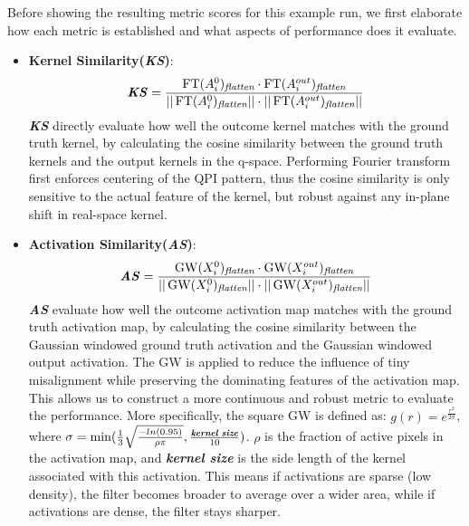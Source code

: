 Before showing the resulting metric scores for this example run, we first elaborate how each metric is established and what aspects of performance does it evaluate. 
\begin{itemize}
	\item \textbf{Kernel Similarity(\textit{KS})}: 
	\begin{equation}
		\textbf{\textit{KS}} = \frac{\operatorname{FT}(A_i^0)_{\textit{flatten}} \cdot  \operatorname{FT}(A_i^{out})_{\textit{flatten}}}{\vert \vert \operatorname{FT}(A_i^0)_{\textit{flatten}} \vert \vert \cdot  \vert \vert \operatorname{FT}(A_i^{out})_{\textit{flatten}}\vert \vert}
	\end{equation}
	\textbf{\textit{KS}} directly evaluate how well the outcome kernel matches with the ground truth kernel, by calculating the cosine similarity between the ground truth kernels and the output kernels in the q-space. Performing Fourier transform first enforces centering of the \ac{QPI} pattern, thus the cosine similarity is only sensitive to the actual feature of the kernel, but robust against any in-plane shift in real-space kernel. 
	
	\item \textbf{Activation Similarity(\textit{AS})}: 
	\begin{equation}
		\textbf{\textit{AS}} = \frac{\operatorname{GW}(X_i^0)_{\textit{flatten}} \cdot  \operatorname{GW}(X_i^{out})_{\textit{flatten}}}{\vert \vert \operatorname{GW}(X_i^0)_{\textit{flatten}} \vert \vert \cdot  \vert \vert \operatorname{GW}(X_i^{out})_{\textit{flatten}}\vert \vert}
	\end{equation}
	\textbf{\textit{AS}} evaluate how well the outcome activation map matches with the ground truth activation map, by calculating the cosine similarity between the Gaussian windowed ground truth activation and the Gaussian windowed output activation. The GW is applied to reduce the influence of tiny misalignment while preserving the dominating features of the activation map. This allows us to construct a more continuous and robust metric to evaluate the performance. More specifically, the square GW is defined as: $g(r)= e^{\frac{r^2}{2 \sigma}}$, where $\sigma = \operatorname{min}(\frac{1}{3}\sqrt{\frac{-ln(0.95)}{\rho \pi}}, \frac{\textbf{\textit{kernel size}}}{10})$. $\rho$ is the fraction of active pixels in the activation map, and \textbf{\textit{kernel size}} is the side length of the kernel associated with this activation. This means if activations are sparse (low density), the filter becomes broader to average over a wider area, while if activations are dense, the filter stays sharper.
	

\end{itemize}
